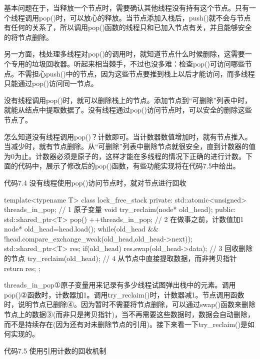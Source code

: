基本问题在于，当释放一个节点时，需要确认其他线程没有持有这个节点。只有一个线程调用pop()时，可以放心的释放。当节点添加入栈后，push()就不会与节点有任何的关系了，所以调用pop()函数的线程只和已加入节点有关，并且能够安全的将节点删除。

另一方面，栈处理多线程对pop()的调用时，就知道节点什么时候删除，这需要一个专用的垃圾回收器。听起来相当棘手，不过也没多难：检查pop()可访问哪些节点。不需担心push()中的节点，因为这些节点要推到栈上以后才能访问，而多线程只能通过pop()访问同一节点。

没有线程调用pop()时，就可以删除栈上的节点。添加节点到“可删除”列表中时，就能从结点中提取数据了。没有线程通过pop()访问节点时，可以安全的删除这些节点了。

怎么知道没有线程调用pop()？计数即可。当计数器数值增加时，就有节点推入。当减少时，就有节点删除。从“可删除”列表中删除节点就很安全，直到计数器的值为0为止。计数器必须是原子的，这样才能在多线程的情况下正确的进行计数。下面的代码中，展示了修改后的pop()函数，有些功能实现将在代码7.5中给出。

代码7.4 没有线程使用pop()访问节点时，就对节点进行回收

\begin{cpp}
template<typename T>
class lock_free_stack
{
private:
  std::atomic<unsigned> threads_in_pop;  // 1 原子变量
  void try_reclaim(node* old_head);
public:
  std::shared_ptr<T> pop()
  {
    ++threads_in_pop;  // 2 在做事之前，计数值加1
    node* old_head=head.load();
    while(old_head &&
      !head.compare_exchange_weak(old_head,old_head->next));
    std::shared_ptr<T> res;
    if(old_head)
    {
      res.swap(old_head->data);  // 3 回收删除的节点
    }
    try_reclaim(old_head);  // 4 从节点中直接提取数据，而非拷贝指针
    return res;
  }
};
\end{cpp}

threads\_in\_pop①原子变量用来记录有多少线程试图弹出栈中的元素。调用pop()②函数时，计数器加1。调用try\_reclaim()时，计数器减1。节点调用函数时，说明节点已删除④。因为暂时不需要将节点删除，可以通过swap()函数来删除节点上的数据③(而非只是拷贝指针)，当不再需要这些数据时，数据会自动删除，而不是持续存在(因为还有对未删除节点的引用)。接下来看一下try\_reclaim()是如何实现的。

代码7.5 使用引用计数的回收机制

